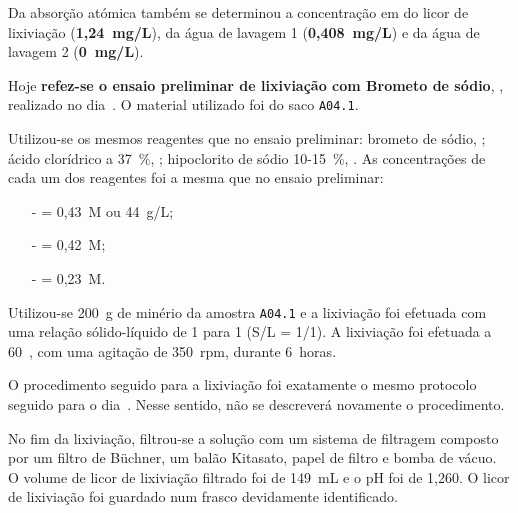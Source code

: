 Da absorção atómica também se determinou a concentração em  do licor de lixiviação (\textbf{1,24~mg/L}), da água de lavagem 1 (\textbf{0,408~mg/L}) e da água de lavagem 2 (\textbf{0~mg/L}).

\hrulefill

\label{day:10-janeiro-2025}

Hoje \textbf{refez-se o ensaio preliminar de lixiviação com Brometo de sódio}, \bromo{}, realizado no dia~.
O material utilizado foi do saco \texttt{A04.1}.

Utilizou-se os mesmos reagentes que no ensaio preliminar: brometo de sódio, \bromo{}; ácido clorídrico a 37~\%, \acl{}; hipoclorito de sódio 10-15~\%, \hipso{}.
As concentrações de cada um dos reagentes foi a mesma que no ensaio preliminar:

\begin{itemize}
    \item[-] \bromo{} = 0,43~M ou 44~g/L;
    \item[-] \acl{} = 0,42~M;
    \item[-] \hipso{} = 0,23~M.
\end{itemize}

Utilizou-se 200~g de minério da amostra \texttt{A04.1} e a lixiviação foi efetuada com uma relação sólido-líquido de 1 para 1 (S/L = 1/1).
A lixiviação foi efetuada a 60~\graus{}, com uma agitação de 350~rpm, durante 6~horas.


O procedimento seguido para a lixiviação foi exatamente o mesmo protocolo seguido para o dia~.
Nesse sentido, não se descreverá novamente o procedimento.

No fim da lixiviação, filtrou-se a solução com um sistema de filtragem composto por um filtro de Büchner, um balão Kitasato, papel de filtro e bomba de vácuo.
O volume de licor de lixiviação filtrado foi de 149~mL e o pH foi de 1,260.
O licor de lixiviação foi guardado num frasco devidamente identificado.

